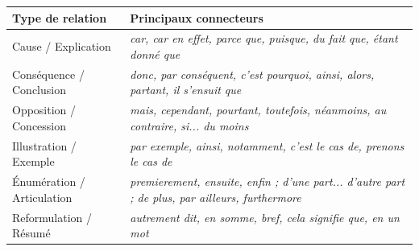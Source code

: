 \documentclass[11pt]{article}
\begin{document}
\begin{center}
\begin{tabularx}{\linewidth}{|l|X|}\hline
\textbf{Type de relation} & \textbf{Principaux connecteurs} \\ \hline
Cause / Explication & \emph{car, car en effet, parce que, puisque, du fait que, étant donné que} \\ \hline
Conséquence / Conclusion & \emph{donc, par conséquent, c'est pourquoi, ainsi, alors, partant, il s'ensuit que} \\ \hline
Opposition / Concession & \emph{mais, cependant, pourtant, toutefois, néanmoins, au contraire, si... du moins} \\ \hline
Illustration / Exemple & \emph{par exemple, ainsi, notamment, c'est le cas de, prenons le cas de} \\ \hline
Énumération / Articulation & \emph{premierement, ensuite, enfin ; d'une part... d'autre part ; de plus, par ailleurs, furthermore} \\ \hline
Reformulation / Résumé & \emph{autrement dit, en somme, bref, cela signifie que, en un mot} \\ \hline
\end{tabularx}
\end{center}
\end{document}
